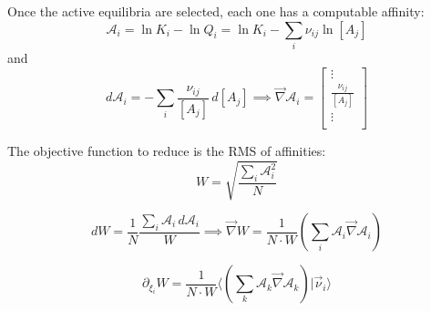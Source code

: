 \documentclass[aps,12pt]{revtex4}
\begin{document}
Once the active equilibria are selected, each one has a computable 
affinity:
\begin{equation}
\label{eq:affinity}
	\mathcal A_i = \ln K_i - \ln Q_i = \ln K_i -  \sum_{i} \nu_{ij} \ln [A_j] %
\end{equation}
and
\begin{equation}
	d \mathcal A_i = - \sum_i \dfrac{\nu_{ij}}{[A_j]} \, d[A_j] \implies
	 \vec \nabla \mathcal A_i = 
	\begin{bmatrix}
	\vdots\\
	\frac{\nu_{ij}}{[A_j]}\\
	\vdots\\
	\end{bmatrix}
\end{equation}

The objective function to reduce is the RMS of affinities:
\begin{equation}
	W = \sqrt{ \dfrac{\sum_i \mathcal A_i^2}{N} } 
\end{equation}

\begin{equation}
	dW = \dfrac{1}{N} \dfrac{\sum_i \mathcal A_i \, d \mathcal A_i}{W}
	\implies
	\vec \nabla W = \dfrac{1}{N\cdot W} \left( \sum_i \mathcal A_i \vec \nabla \mathcal A_i \right)
\end{equation}

\begin{equation}
\partial_{\xi_i} W = \dfrac{1}{N\cdot W} \langle \left( \sum_k \mathcal A_k \vec \nabla \mathcal A_k \right) \vert \vec \nu_i \rangle
\end{equation}
\end{document}
